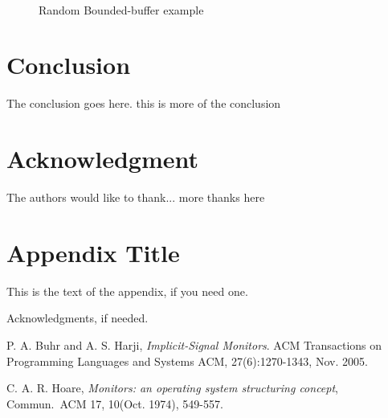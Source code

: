 \documentclass[preprint]{sigplanconf}
\begin{document}
\begin{figure}
  \centering
  \\
  \caption{Random Bounded-buffer example}
  \label{fig:rbb_exp}
\end{figure}



\section{Conclusion} \label{sec:conclu}
The conclusion goes here. this is more of the conclusion



\section*{Acknowledgment}

The authors would like to thank...
more thanks here








\appendix
\section{Appendix Title}

This is the text of the appendix, if you need one.

\acks

Acknowledgments, if needed.





\begin{thebibliography}{}
\softraggedright

  P. A. Buhr and A. S. Harji, \emph{Implicit-Signal Monitors}. ACM 
  Transactions on Programming Languages and Systems ACM, 27(6):1270-1343, 
  Nov. 2005.

  C. A. R. Hoare, \emph{Monitors: an operating system structuring concept}, 
  Commun.~ACM 17, 10(Oct. 1974), 549-557.



\end{thebibliography}
\end{document}
